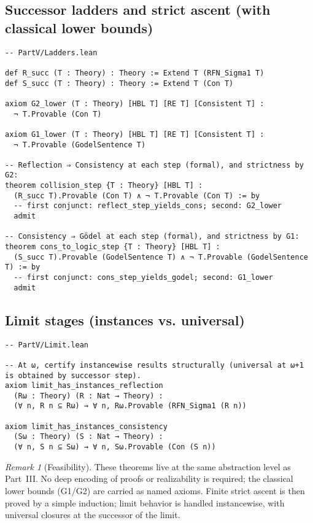 \documentclass[11pt]{article}
\theoremstyle{definition}
\theoremstyle{remark}
\newtheorem{remark}[theorem]{Remark}
\begin{document}
\subsection*{Successor ladders and strict ascent (with classical lower bounds)}
\begin{verbatim}
-- PartV/Ladders.lean

def R_succ (T : Theory) : Theory := Extend T (RFN_Sigma1 T)
def S_succ (T : Theory) : Theory := Extend T (Con T)

axiom G2_lower (T : Theory) [HBL T] [RE T] [Consistent T] :
  ¬ T.Provable (Con T)

axiom G1_lower (T : Theory) [HBL T] [RE T] [Consistent T] :
  ¬ T.Provable (GodelSentence T)

-- Reflection ⇒ Consistency at each step (formal), and strictness by G2:
theorem collision_step {T : Theory} [HBL T] :
  (R_succ T).Provable (Con T) ∧ ¬ T.Provable (Con T) := by
  -- first conjunct: reflect_step_yields_cons; second: G2_lower
  admit

-- Consistency ⇒ Gödel at each step (formal), and strictness by G1:
theorem cons_to_logic_step {T : Theory} [HBL T] :
  (S_succ T).Provable (GodelSentence T) ∧ ¬ T.Provable (GodelSentence T) := by
  -- first conjunct: cons_step_yields_godel; second: G1_lower
  admit
\end{verbatim}

\subsection*{Limit stages (instances vs. universal)}
\begin{verbatim}
-- PartV/Limit.lean

-- At ω, certify instancewise results structurally (universal at ω+1 is obtained by successor step).
axiom limit_has_instances_reflection
  (Rω : Theory) (R : Nat → Theory) :
  (∀ n, R n ⊆ Rω) → ∀ n, Rω.Provable (RFN_Sigma1 (R n))

axiom limit_has_instances_consistency
  (Sω : Theory) (S : Nat → Theory) :
  (∀ n, S n ⊆ Sω) → ∀ n, Sω.Provable (Con (S n))
\end{verbatim}

\begin{remark}[Feasibility]
These theorems live at the same abstraction level as Part~III. No deep encoding of proofs
or realizability is required; the classical lower bounds (G1/G2) are carried as named axioms.
Finite strict ascent is then proved by a simple induction; limit behavior is handled instancewise,
with universal closures at the successor of the limit.
\end{remark}
\end{document}
